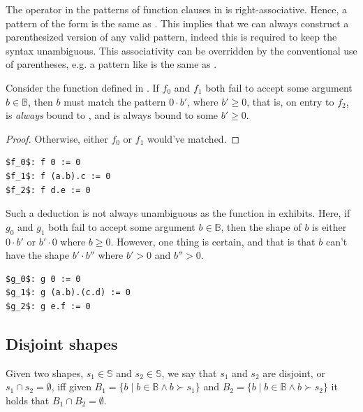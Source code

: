 The  operator in the patterns of function clauses in \D{} is
right-associative. Hence, a pattern of the form  is the same as
. This implies that we can always construct a parenthesized
version of any valid pattern, indeed this is required to keep the syntax
unambiguous. This associativity can be overridden by the conventional use of
parentheses, e.g. a pattern like  is the same as
. 

Consider the function defined in . If $f_0$ and
$f_1$ both fail to accept some argument $b\in\mathbb{B}$, then $b$ must match
the pattern $0\cdot b'$, where $b'\geq 0$, that is, on entry to $f_2$, 
is \emph{always} bound to , and  is always bound to some
$b'\geq 0$.

\begin{proof} Otherwise, either $f_0$ or $f_1$ would've matched. \end{proof}

\begin{lstlisting}[label=listing:deducing-zero,
  caption={A sample program for showing 0-deduction.}]
$f_0$: f 0 := 0
$f_1$: f (a.b).c := 0
$f_2$: f d.e := 0
\end{lstlisting}

Such a deduction is not always unambiguous as the function in
 exhibits. Here, if $g_0$ and $g_1$ both
fail to accept some argument $b\in\mathbb{B}$, then the shape of $b$ is either
$0\cdot b'$ or $b'\cdot 0$ where $b\geq 0$. However, one thing is certain, and
that is that $b$ can't have the shape $b'\cdot b''$ where $b'>0$ and $b''>0$.

\begin{lstlisting}[label=listing:deducing-zero-fail,
  caption={A sample program where 0-deduction is ambiguous.}]
$g_0$: g 0 := 0
$g_1$: g (a.b).(c.d) := 0
$g_2$: g e.f := 0
\end{lstlisting}

\subsection{Disjoint shapes}

\begin{definition} Given two shapes, $s_1\in\mathbb{S}$ and $s_2\in\mathbb{S}$,
we say that $s_1$ and $s_2$ are disjoint, or $s_1\cap s_2=\emptyset$, iff given
$B_1=\{b\mid b\in\mathbb{B} \wedge b\succ s_1\}$ and $B_2=\{b\mid
b\in\mathbb{B} \wedge b\succ s_2\}$ it holds that $B_1\cap
B_2=\emptyset$.\end{definition}


